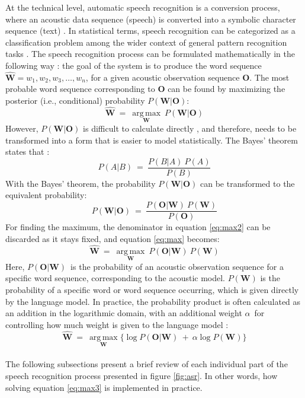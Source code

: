 \documentclass[english, 12pt, a4paper, pdftex, elec, utf8]{aaltothesis}
\DeclareMathOperator*{\argmax}{arg\,max}
\begin{document}
At the technical level, automatic speech recognition is a conversion process, where an acoustic data sequence (speech) is converted into a symbolic character sequence (text) \cite{yu2014automatic}. In statistical terms, speech recognition can be categorized as a classification problem among the wider context of general pattern recognition tasks \cite{huang2001spoken}. The speech recognition process can be formulated mathematically in the following way \cite{huang2001spoken, gales2008application, kallasjoki2016}: the goal of the system is to produce the word sequence $ \hat{\bm{W}} = w_1, w_2, w_3,\dots,w_n$, for a given acoustic observation sequence $\bm{O}$. The most probable word sequence corresponding to $\bm{O}$ can be found by maximizing the posterior (i.e., conditional) probability $P(\bm{W} | \bm{O})$:
\begin{equation} \label{eq:max}
\hat{\bm{W}} \ = \ \underset{\bm{W}}{\argmax} \ P(\bm{W} | \bm{O})
\end{equation}
However, $P(\bm{W} | \bm{O})$ is difficult to calculate directly \cite{gales2008application}, and therefore, needs to be transformed into a form that is easier to model statistically. The Bayes' theorem states that \cite[p.~10]{hori2013speech}:
\begin{equation}
P(A | B) \ = \ \frac{P(B | A) \ P(A)}{P(B)}
\end{equation}
With the Bayes' theorem, the probability $P(\bm{W} | \bm{O})$ can be transformed to the equivalent probability:
\begin{equation} \label{eq:max2}
P(\bm{W} | \bm{O}) \ = \ \frac{P(\bm{O} | \bm{W}) \ P(\bm{W})}{P(\bm{O})}
\end{equation}
For finding the maximum, the denominator in equation \ref{eq:max2} can be discarded as it stays fixed, and equation \ref{eq:max} becomes:
\begin{equation} \label{eq:max3}
\hat{\bm{W}} \ = \ \underset{\bm{W}}{\argmax} \ P(\bm{O} | \bm{W}) \ P(\bm{W})
\end{equation}
Here, $P(\bm{O} | \bm{W})$ is the probability of an acoustic observation sequence for a specific word sequence, corresponding to the acoustic model. $P(\bm{W})$ is the probability of a specific word or word sequence occurring, which is given directly by the language model. In practice, the probability product is often calculated as an addition in the logarithmic domain, with an additional weight $\alpha$ for controlling how much weight is given to the language model \cite[p.~200]{gales2008application}:
\begin{equation}
\hat{\bm{W}} \ = \ \underset{\bm{W}}{\argmax} \big\{ \log P(\bm{O} | \bm{W}) \ + \ \alpha \log P(\bm{W}) \big\}
\end{equation} \\
The following subsections present a brief review of each individual part of the speech recognition process presented in figure \ref{fig:asr}. In other words, how solving equation \ref{eq:max3} is implemented in practice.
\end{document}
